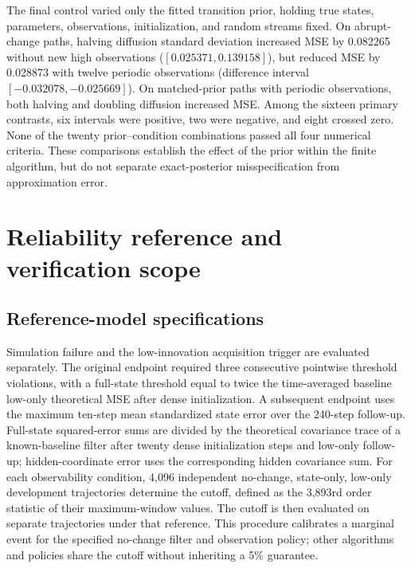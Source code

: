 \documentclass[11pt,a4paper]{article}
\begin{document}
The final control varied only the fitted transition prior, holding true states, parameters, observations, initialization, and random streams fixed. On abrupt-change paths, halving diffusion standard deviation increased MSE by 0.082265 without new high observations ($[0.025371,0.139158]$), but reduced MSE by 0.028873 with twelve periodic observations (difference interval $[-0.032078,-0.025669]$). On matched-prior paths with periodic observations, both halving and doubling diffusion increased MSE. Among the sixteen primary contrasts, six intervals were positive, two were negative, and eight crossed zero. None of the twenty prior--condition combinations passed all four numerical criteria. These comparisons establish the effect of the prior within the finite algorithm, but do not separate exact-posterior misspecification from approximation error.

\section{Reliability reference and verification scope}
\label{app:reliability}

\subsection{Reference-model specifications}

Simulation failure and the low-innovation acquisition trigger are evaluated separately. The original endpoint required three consecutive pointwise threshold violations, with a full-state threshold equal to twice the time-averaged baseline low-only theoretical MSE after dense initialization. A subsequent endpoint uses the maximum ten-step mean standardized state error over the 240-step follow-up. Full-state squared-error sums are divided by the theoretical covariance trace of a known-baseline filter after twenty dense initialization steps and low-only follow-up; hidden-coordinate error uses the corresponding hidden covariance sum. For each observability condition, 4,096 independent no-change, state-only, low-only development trajectories determine the cutoff, defined as the 3,893rd order statistic of their maximum-window values. The cutoff is then evaluated on separate trajectories under that reference. This procedure calibrates a marginal event for the specified no-change filter and observation policy; other algorithms and policies share the cutoff without inheriting a 5\% guarantee.
\end{document}
